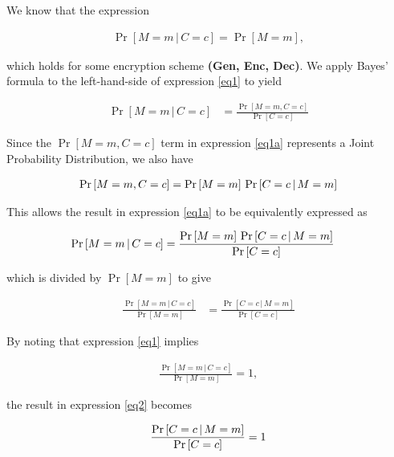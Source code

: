\documentclass[../midterm.tex]{subfiles}
\begin{document}
\begin{flushleft}

 We know that the expression

\begin{align}
\Pr \left[ M = m \, \vert \, C = c \right] = \Pr \left[ M = m \right], \label{eq1}
\end{align}

which holds for some encryption scheme {\selectfont \textbf{(Gen, Enc, Dec)}}. We apply Bayes' formula to the left-hand-side of expression \ref{eq1} to yield

\begin{align}
\Pr \left[ M = m \, \vert \, C = c \right] &= \frac{ \Pr \left[ M = m , C = c \right] }{ \Pr \left[ C = c \right] } \label{eq1a}
\end{align}

Since the $\Pr \left[ M = m , C = c \right]$ term in expression \ref{eq1a} represents a Joint Probability Distribution, we also have

\begin{align}
\Pr \left[ M = m , C = c \right] = \Pr \left[ M = m \right] \, \Pr \left[ C = c \, \vert \, M = m \right] \notag
\end{align}

This allows the result in expression \ref{eq1a} to be equivalently expressed as

\begin{align}
\Pr \left[ M = m \, \vert \, C = c \right] &= \frac{ \Pr \left[ M = m \right] \, \Pr \left[ C = c \, \vert \, M = m \right] }{ \Pr \left[ C = c \right] } \notag
\end{align}

which is divided by $\Pr \left[ M = m \right]$ to give

\begin{align}
\frac{\Pr \left[ M = m \, \vert \, C = c \right] }{ \Pr \left[ M = m \right]} &= \frac{\Pr \left[ C = c \, \vert \, M = m \right] }{ \Pr \left[ C = c \right]} \label{eq2}
\end{align}

By noting that expression \ref{eq1} implies

\begin{align*}
\frac{\Pr \left[ M = m \, \vert \, C = c \right] }{ \Pr \left[ M = m \right]} = 1,
\end{align*}

the result in expression \ref{eq2} becomes

\begin{align}
\frac{\Pr \left[ C = c \, \vert \, M = m \right] }{ \Pr \left[ C = c \right]} = 1 \notag
\end{align}


\end{flushleft}
\end{document}
